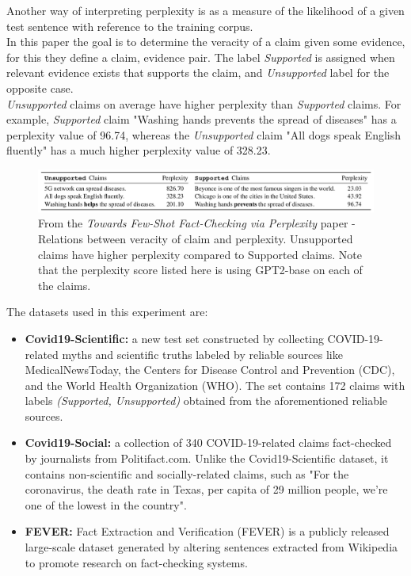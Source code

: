 \documentclass[10pt, english]{report}
\begin{document}
Another way of interpreting perplexity is as a measure of the likelihood of a given test sentence with reference to the training corpus.\\

In this paper the goal is to determine the veracity of a claim given some evidence, for this they define a {claim, evidence} pair. The label \emph{Supported} is assigned when relevant evidence exists that supports the claim, and \emph{Unsupported} label for the opposite case.\\
\emph{Unsupported} claims on average have higher perplexity than \emph{Supported} claims. For example, \emph{Supported} claim "Washing hands prevents the spread of diseases" has a perplexity value of 96.74, whereas the \emph{Unsupported} claim "All dogs speak English fluently" has a much higher perplexity value of 328.23. 

\begin{figure}[H]
	\centering
	\includegraphics[scale=0.43]{img/supported_unsupported_perplexity.png}
	\caption{From the \textit{Towards Few-Shot Fact-Checking via Perplexity} paper - Relations between veracity of claim and perplexity. Unsupported claims have higher perplexity compared to Supported claims. Note that the perplexity score listed here is using GPT2-base on each of the claims.}
\end{figure}

The datasets used in this experiment are:

\begin{itemize}
\item \textbf{Covid19-Scientific:} a new test set constructed by collecting COVID-19-related myths and scientific truths labeled by reliable sources like MedicalNewsToday, the Centers for Disease Control and Prevention (CDC), and the World Health Organization (WHO). The set contains 172 claims with labels \emph{(Supported, Unsupported)} obtained from the aforementioned reliable sources.
\item \textbf{Covid19-Social:} a collection of 340 COVID-19-related claims fact-checked by journalists from Politifact.com. Unlike the Covid19-Scientific dataset, it contains non-scientific and socially-related claims, such as "For the coronavirus, the death rate in Texas, per capita of 29 million people, we're one of the lowest in the country".
\item \textbf{FEVER:} Fact Extraction and Verification (FEVER) is a publicly released large-scale dataset generated by altering sentences extracted from Wikipedia to promote research on fact-checking systems.
\end{itemize}
\end{document}
